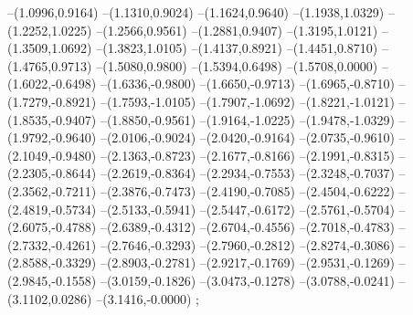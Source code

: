 {--(1.0996,0.9164)
--(1.1310,0.9024)
--(1.1624,0.9640)
--(1.1938,1.0329)
--(1.2252,1.0225)
--(1.2566,0.9561)
--(1.2881,0.9407)
--(1.3195,1.0121)
--(1.3509,1.0692)
--(1.3823,1.0105)
--(1.4137,0.8921)
--(1.4451,0.8710)
--(1.4765,0.9713)
--(1.5080,0.9800)
--(1.5394,0.6498)
--(1.5708,0.0000)
--(1.6022,-0.6498)
--(1.6336,-0.9800)
--(1.6650,-0.9713)
--(1.6965,-0.8710)
--(1.7279,-0.8921)
--(1.7593,-1.0105)
--(1.7907,-1.0692)
--(1.8221,-1.0121)
--(1.8535,-0.9407)
--(1.8850,-0.9561)
--(1.9164,-1.0225)
--(1.9478,-1.0329)
--(1.9792,-0.9640)
--(2.0106,-0.9024)
--(2.0420,-0.9164)
--(2.0735,-0.9610)
--(2.1049,-0.9480)
--(2.1363,-0.8723)
--(2.1677,-0.8166)
--(2.1991,-0.8315)
--(2.2305,-0.8644)
--(2.2619,-0.8364)
--(2.2934,-0.7553)
--(2.3248,-0.7037)
--(2.3562,-0.7211)
--(2.3876,-0.7473)
--(2.4190,-0.7085)
--(2.4504,-0.6222)
--(2.4819,-0.5734)
--(2.5133,-0.5941)
--(2.5447,-0.6172)
--(2.5761,-0.5704)
--(2.6075,-0.4788)
--(2.6389,-0.4312)
--(2.6704,-0.4556)
--(2.7018,-0.4783)
--(2.7332,-0.4261)
--(2.7646,-0.3293)
--(2.7960,-0.2812)
--(2.8274,-0.3086)
--(2.8588,-0.3329)
--(2.8903,-0.2781)
--(2.9217,-0.1769)
--(2.9531,-0.1269)
--(2.9845,-0.1558)
--(3.0159,-0.1826)
--(3.0473,-0.1278)
--(3.0788,-0.0241)
--(3.1102,0.0286)
--(3.1416,-0.0000)
;}
